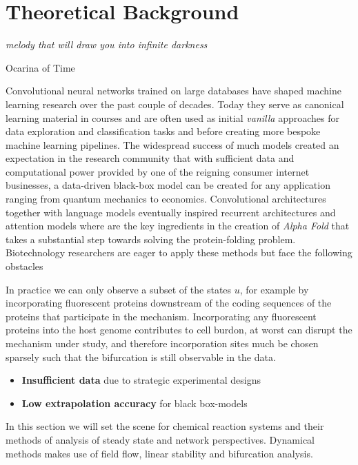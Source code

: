 \chapter{Theoretical Background}
\label{chapter:background}
\epigraph{\textit{melody that will draw you into infinite darkness}}{Ocarina of Time}

Convolutional neural networks trained on large databases \cite{mnist2012,imagenet2009} have shaped machine learning research over the past couple of decades. Today they serve as canonical learning material in courses and are often used as initial \textit{vanilla} approaches for data exploration and classification tasks and before creating more bespoke machine learning pipelines. The widespread success of much models created an expectation in the research community that with sufficient data and computational power provided by one of the reigning consumer internet businesses, a data-driven black-box model can be created for any application ranging from quantum mechanics to economics. Convolutional architectures together with language models eventually inspired recurrent architectures and attention models where are the key ingredients in the creation of \textit{Alpha Fold} \cite{Jumper2021HighlyAlphaFold} that takes a substantial step towards solving the protein-folding problem. Biotechnology researchers are eager to apply these methods but face the following obstacles

In practice we can only observe a subset of the states $u$, for example by incorporating fluorescent proteins downstream of the coding sequences of the proteins that participate in the  mechanism. Incorporating any fluorescent proteins into the host genome contributes to cell burdon, at worst can disrupt the mechanism under study, and therefore incorporation sites much be chosen sparsely such that the bifurcation is still observable in the data.

\begin{itemize}
    \item \textbf{Insufficient data} due to strategic experimental designs 
    \item \textbf{Low extrapolation accuracy} for black box-models
\end{itemize}

In this section we will set the scene for chemical reaction systems and their
methods of analysis of steady state and network perspectives. Dynamical
methods makes use of field flow, linear stability and bifurcation analysis.

